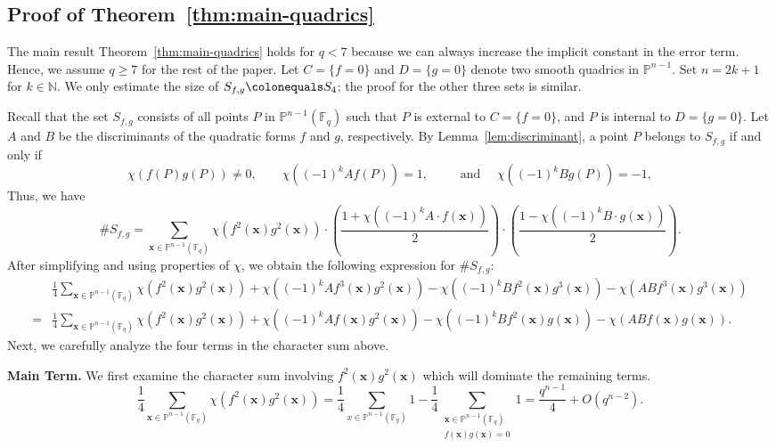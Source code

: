 \documentclass[12pt,reqno]{amsart}
\theoremstyle{definition}
\newcommand{\F}{\mathbb{F}}
\begin{document}
\subsection{Proof of Theorem~\ref{thm:main-quadrics}}\label{sec:proof-main-result}
The main result Theorem~\ref{thm:main-quadrics} holds for $q<7$ because we can always increase the implicit constant in the error term. Hence, we assume $q\geq 7$ for the rest of the paper. Let $C=\{f=0\}$ and $D=\{g=0\}$ denote two smooth quadrics in $\mathbb{P}^{n-1}$. Set $n=2k+1$ for $k\in\mathbb{N}$. We only estimate the size of $S_{f,g}\colonequals S_4$; the proof for the other three sets is similar.

Recall that the set $S_{f, g}$ consists of all points $P$ in $\mathbb{P}^{n-1}(\F_q)$ such that $P$ is external to $C=\{f=0\}$, and $P$ is internal to $D=\{g=0\}$. Let $A$ and $B$ be the discriminants of the quadratic forms $f$ and $g$, respectively. By Lemma~\ref{lem:discriminant}, a point $P$ belongs to $S_{f, g}$ if and only if
$$
\chi(f(P)g(P))\neq 0, \quad \quad \chi((-1)^k A f(P))=1, \ \quad \quad \text{ and } \quad  \chi( (-1)^k B g(P))=-1,
$$
Thus, we have
$$
\#S_{f, g} = \sum_{\mathbf{x}\in\mathbb{P}^{n-1}(\F_q)} \chi(f^2(\mathbf{x}) g^2(\mathbf{x})) \cdot \left(\frac{1+\chi((-1)^kA\cdot f(\mathbf{x}))}{2} \right) \cdot \left(\frac{1-\chi((-1)^kB\cdot g(\mathbf{x}))}{2} \right).
$$
After simplifying and using properties of $\chi$, we obtain the following expression for $\# S_{f, g}$:
\begin{align*}
& \frac{1}{4} \sum_{\mathbf{x}\in\mathbb{P}^{n-1}(\F_q)} \chi(f^2(\mathbf{x}) g^2(\mathbf{x})) + \chi((-1)^kA f^3(\mathbf{x}) g^2(\mathbf{x})) - \chi((-1)^kB f^2(\mathbf{x})g^3(\mathbf{x})) - \chi(AB f^3(\mathbf{x}) g^3(\mathbf{x})) \\
=& \frac{1}{4} \sum_{\mathbf{x} \in\mathbb{P}^{n-1}(\F_q)} \chi(f^2(\mathbf{x}) g^2(\mathbf{x})) + \chi((-1)^kA f(\mathbf{x}) g^2(\mathbf{x})) - \chi((-1)^k B f^2(\mathbf{x})g(\mathbf{x})) - \chi(AB f(\mathbf{x}) g(\mathbf{x})).
\end{align*}
Next, we carefully analyze the four terms in the character sum above.

\medskip 

\textbf{Main Term.} We first examine the character sum involving $f^2(\mathbf{x})g^{2}(\mathbf{x})$ which will dominate the remaining terms.
\begin{equation}\label{eq:1st}
\frac{1}{4} \sum_{\mathbf{x}\in\mathbb{P}^{n-1}(\F_q)} \chi(f^2(\mathbf{x})g^2(\mathbf{x})) 
= \frac{1}{4} \sum_{x\in\mathbb{P}^{n-1}(\F_q)} 1 -  \frac{1}{4} \sum_{\substack{\mathbf{x}\in\mathbb{P}^{n-1}(\F_q) \\ f(\mathbf{x}) g(\mathbf{x})=0}} 1 = \frac{q^{n-1}}{4} + O(q^{n-2}).  
\end{equation}
\end{document}
